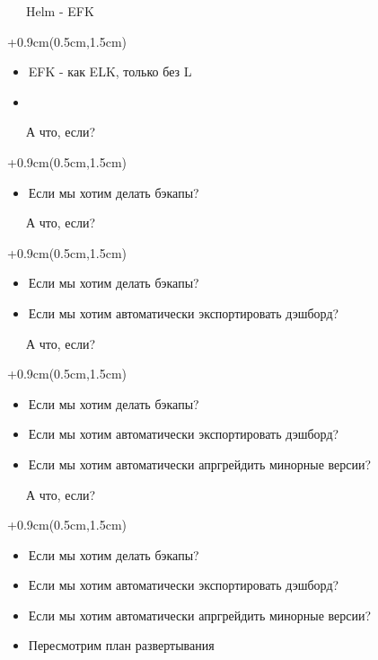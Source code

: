 \documentclass[xetex,18pt,aspectratio=43]{beamer}
\begin{document}
\begin{Large}
\begin{frame}{\ \ \ Helm - EFK}
\begin{textblock*}{\framewidth+0.9cm}(0.5cm,1.5cm)
\begin{itemize}
  \item EFK - как ELK, только без L
  \item \href{https://github.com/alexclear/k8s-freehck-efk-lab}{\color{linkcolor}{github.com/alexclear/k8s-freehck-efk-lab}}
\end{itemize}
\end{textblock*}
\end{frame}

\begin{frame}{\ \ \ А что, если?}
\begin{textblock*}{\framewidth+0.9cm}(0.5cm,1.5cm)
\begin{itemize}
  \item Если мы хотим делать бэкапы?
\end{itemize}
\end{textblock*}
\end{frame}

\begin{frame}{\ \ \ А что, если?}
\begin{textblock*}{\framewidth+0.9cm}(0.5cm,1.5cm)
\begin{itemize}
  \item Если мы хотим делать бэкапы?
  \item Если мы хотим автоматически экспортировать дэшборд?
\end{itemize}
\end{textblock*}
\end{frame}

\begin{frame}{\ \ \ А что, если?}
\begin{textblock*}{\framewidth+0.9cm}(0.5cm,1.5cm)
\begin{itemize}
  \item Если мы хотим делать бэкапы?
  \item Если мы хотим автоматически экспортировать дэшборд?
  \item Если мы хотим автоматически апргрейдить минорные версии?
\end{itemize}
\end{textblock*}
\end{frame}

\begin{frame}{\ \ \ А что, если?}
\begin{textblock*}{\framewidth+0.9cm}(0.5cm,1.5cm)
\begin{itemize}
  \item Если мы хотим делать бэкапы?
  \item Если мы хотим автоматически экспортировать дэшборд?
  \item Если мы хотим автоматически апргрейдить минорные версии?
  \item Пересмотрим план развертывания
\end{itemize}
\end{textblock*}
\end{frame}


\end{Large}
\end{document}

